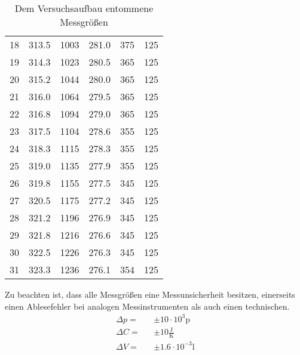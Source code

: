 \begin{table}
\begin{tabular}{c c c c c c}
    18	& 313.5	& 1003	& 281.0	& 375	& 125	\\
    19	& 314.3	& 1023	& 280.5	& 365	& 125	\\
    20	& 315.2	& 1044	& 280.0	& 365	& 125	\\
    21	& 316.0	& 1064	& 279.5	& 365	& 125	\\
    22	& 316.8	& 1094	& 279.0	& 365	& 125	\\
    23	& 317.5	& 1104	& 278.6	& 355	& 125	\\
    24	& 318.3	& 1115	& 278.3	& 355	& 125	\\
    25	& 319.0	& 1135	& 277.9	& 355	& 125	\\
    26	& 319.8	& 1155	& 277.5	& 345	& 125	\\
    27	& 320.5	& 1175	& 277.2	& 345	& 125	\\
    28	& 321.2	& 1196	& 276.9	& 345	& 125	\\
    29	& 321.8	& 1216	& 276.6	& 345	& 125	\\
    30	& 322.5	& 1226	& 276.3	& 345	& 125	\\
    31	& 323.3	& 1236	& 276.1	& 354	& 125	\\
  \end{tabular}
  \caption{Dem Versuchsaufbau entommene Messgrößen}
  \label{tab:Daten}
\end{table}

Zu beachten ist, dass alle Messgrößen eine Messunsicherheit besitzen, einerseits einen Ablesefehler bei analogen Messinstrumenten als auch einen technischen.
\begin{eqnarray*}
  \Delta p =& &\pm 10 \cdot 10^{3} \text{p}				\\
  \Delta C =& &\pm 10 \frac{\text{J}}{\text{K}}		\\
  \Delta V =& &\pm 1.6 \cdot 10^{-3} \text{l}				\\
\end{eqnarray*}
